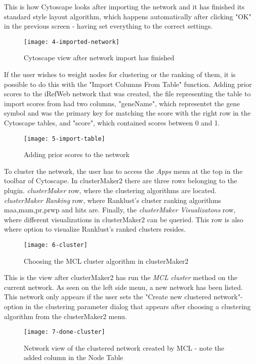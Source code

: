 This is how Cytoscape looks after importing the network and it has finished its
standard style layout algorithm, which happens automatically after clicking "OK"
in the previous screen - having set everything to the correct settings.
\begin{figure}[H]
    \texttt{[image: 4-imported-network]}
    \caption{Cytoscape view after network import has finished}
    \label{fig:imported-network}
\end{figure}

If the user wishes to weight nodes for clustering or the ranking of them, it is
possible to do this with the "Import Columns From Table" function. Adding prior
scores to the iRefWeb network that was created, the file representing the table
to import scores from had two columns, "geneName", which representet the gene
symbol and was the primary key for matching the score with the right row in the
Cytoscape tables, and "score", which contained scores between 0 and 1.
\begin{figure}[H]
    \texttt{[image: 5-import-table]}
    \caption{Adding prior scores to the network}
    \label{fig:import-table}
\end{figure}

To cluster the network, the user has to access the \textit{Apps} menu at the top
in the toolbar of Cytoscape. In clusterMaker2 there are three rows belonging
to the plugin. \textit{clusterMaker} row, where the clustering algorithms are
located. \textit{clusterMaker Ranking} row, where Ranklust's cluster ranking
algorithms \gls{maa},\gls{mam},\gls{pr},\gls{prwp} and \gls{hits} are. Finally,
the \textit{clusterMaker Visualizatons} row, where different visualizations in
clusterMaker2 can be queried. This row is also where option to visualize
Ranklust's ranked clusters resides.
\begin{figure}[H]
    \texttt{[image: 6-cluster]}
    \caption{Choosing the MCL cluster algorithm in clusterMaker2}
    \label{fig:cluster}
\end{figure}

This is the view after clusterMaker2 has run the \textit{MCL cluster} method on
the current network. As seen on the left side menu, a new network has been
listed. This network only appears if the user sets the "Create new clustered
network"-option in the clustering parameter dialog that appears after choosing a
clustering algorithm from the clusterMaker2 menu.
\begin{figure}[H]
    \texttt{[image: 7-done-cluster]}
    \caption{Network view of the clustered network created by MCL - note the
    added column in the Node Table}
    \label{fig:done-cluster}
\end{figure}

